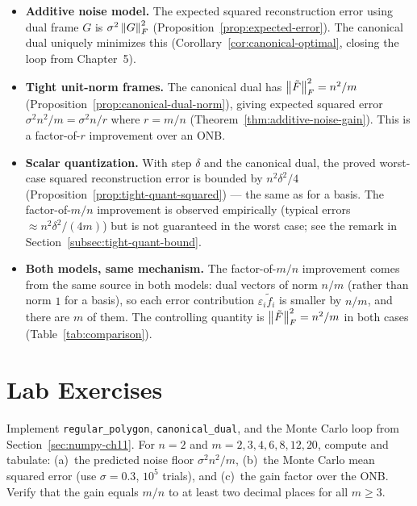 \begin{itemize}
  \item \textbf{Additive noise model.} The expected squared reconstruction
        error using dual frame $G$ is $\sigma^2\left\| G \right\|_F^2$
        (Proposition~\ref{prop:expected-error}). The canonical dual
        uniquely minimizes this (Corollary~\ref{cor:canonical-optimal},
        closing the loop from Chapter~5).

  \item \textbf{Tight unit-norm frames.} The canonical dual has
        $\left\| \tilde F \right\|_F^2 = n^2/m$
        (Proposition~\ref{prop:canonical-dual-norm}), giving expected
        squared error $\sigma^2 n^2/m = \sigma^2 n/r$ where $r=m/n$
        (Theorem~\ref{thm:additive-noise-gain}). This is a factor-of-$r$
        improvement over an ONB.

  \item \textbf{Scalar quantization.} With step $\delta$ and the
        canonical dual, the proved worst-case squared reconstruction
        error is bounded by $n^2\delta^2/4$
        (Proposition~\ref{prop:tight-quant-squared}) --- the same as for
        a basis. The factor-of-$m/n$ improvement is observed empirically
        (typical errors $\approx n^2\delta^2/(4m)$) but is not guaranteed
        in the worst case; see the remark in Section~\ref{subsec:tight-quant-bound}.

  \item \textbf{Both models, same mechanism.} The factor-of-$m/n$
        improvement comes from the same source in both models: dual
        vectors of norm $n/m$ (rather than norm $1$ for a basis), so each
        error contribution $\varepsilon_i\tilde f_i$ is smaller by $n/m$,
        and there are $m$ of them. The controlling quantity is
        $\left\| \tilde F \right\|_F^2 = n^2/m$ in both cases (Table~\ref{tab:comparison}).
\end{itemize}

\section{Lab Exercises}
\label{sec:lab-ch11}

\begin{exercisebox}[title={Lab Exercise 11.1: Reproducing the Noise Floor Table}]
Implement \texttt{regular\_polygon}, \texttt{canonical\_dual}, and the
Monte Carlo loop from Section~\ref{sec:numpy-ch11}. For $n=2$ and
$m=2,3,4,6,8,12,20$, compute and tabulate: (a)~the predicted noise
floor $\sigma^2 n^2/m$, (b)~the Monte Carlo mean squared error (use
$\sigma=0.3$, $10^5$ trials), and (c)~the gain factor over the ONB.
Verify that the gain equals $m/n$ to at least two decimal places for
all $m\ge3$.
\end{exercisebox}

